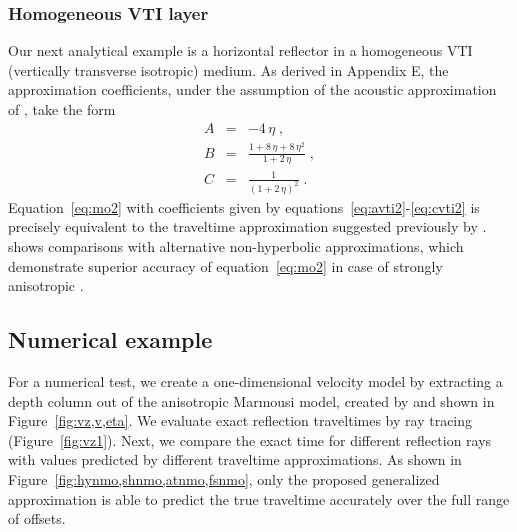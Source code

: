 
\subsubsection{Homogeneous VTI layer}

Our next analytical example is a horizontal reflector in a homogeneous
VTI (vertically transverse isotropic) medium. As derived in Appendix
E, the approximation coefficients, under the assumption of the
acoustic approximation of \cite{GEO63-02-06230631}, take the form
\begin{eqnarray}
\label{eq:avti2}
A & = & -4\,\eta\;, \\
\label{eq:bvti2}
B & = & \frac{1 + 8\,\eta + 8\,\eta^2}{1 + 2\,\eta}\;, \\
\label{eq:cvti2}
C & = & \frac{1}{(1 + 2\,\eta)^2}\;.
\end{eqnarray}
Equation~\ref{eq:mo2} with coefficients given by
equations~\ref{eq:avti2}-\ref{eq:cvti2} is precisely equivalent to the
traveltime approximation suggested previously by
\cite{GPR52-03-02470259}. \cite{GPR52-03-02470259} shows comparisons
with alternative non-hyperbolic approximations, which demonstrate
superior accuracy of equation~\ref{eq:mo2} in  case of strongly
anisotropic  .

\subsection{Numerical example}

For a numerical test, we create a one-dimensional velocity model by
extracting a depth column out of the anisotropic Marmousi model,
created by \cite{Alkhalifah.sep.95.tariq3} and shown in
Figure~\ref{fig:vz,v,eta}. We evaluate exact reflection traveltimes by
ray tracing (Figure~\ref{fig:vz1}). Next, we compare the exact time
for different reflection rays with values predicted by different
traveltime approximations. As shown in
Figure~\ref{fig:hynmo,shnmo,atnmo,fsnmo}, only the proposed
generalized approximation is able to predict the true traveltime
accurately over the full range of offsets. 

